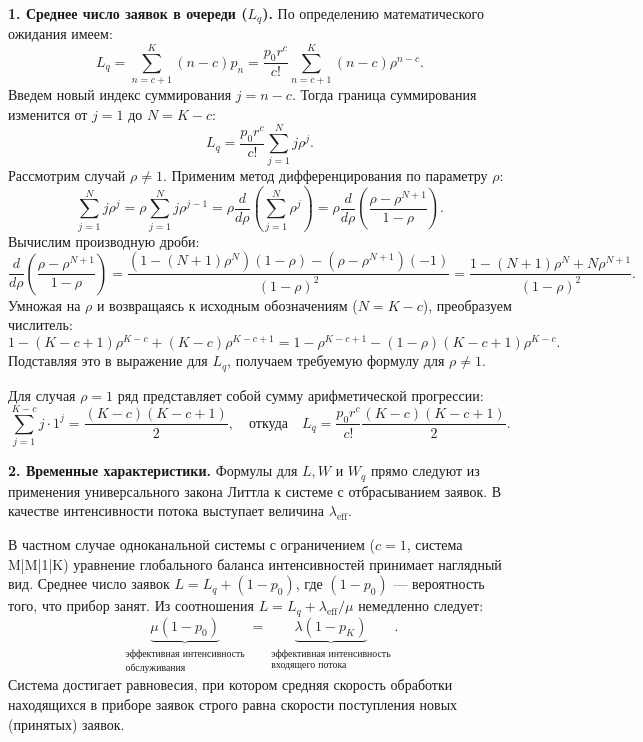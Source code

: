 \begin{sproof}
\textbf{1. Среднее число заявок в очереди ($L_q$).} По определению математического ожидания имеем:
$$
L_q = \sum_{n=c+1}^{K} (n - c) p_n = \frac{p_0 r^c}{c!} \sum_{n=c+1}^{K} (n - c) \rho^{n-c}.
$$
Введем новый индекс суммирования $j = n - c$. Тогда граница суммирования изменится от $j = 1$ до $N = K - c$:
$$
L_q = \frac{p_0 r^c}{c!} \sum_{j=1}^{N} j \rho^j.
$$
Рассмотрим случай $\rho \ne 1$. Применим метод дифференцирования по параметру $\rho$:
$$
\sum_{j=1}^{N} j \rho^j = \rho \sum_{j=1}^{N} j \rho^{j-1} = \rho \frac{d}{d\rho} \left( \sum_{j=1}^{N} \rho^j \right) = \rho \frac{d}{d\rho} \left( \frac{\rho - \rho^{N+1}}{1 - \rho} \right).
$$
Вычислим производную дроби:
$$
\frac{d}{d\rho} \left( \frac{\rho - \rho^{N+1}}{1 - \rho} \right) = \frac{(1 - (N+1)\rho^N)(1 - \rho) - (\rho - \rho^{N+1})(-1)}{(1 - \rho)^2} = \frac{1 - (N+1)\rho^N + N\rho^{N+1}}{(1 - \rho)^2}.
$$
Умножая на $\rho$ и возвращаясь к исходным обозначениям ($N = K - c$), преобразуем числитель:
$$
1 - (K - c + 1)\rho^{K-c} + (K - c)\rho^{K-c+1} = 1 - \rho^{K-c+1} - (1 - \rho)(K - c + 1)\rho^{K-c}.
$$
Подставляя это в выражение для $L_q$, получаем требуемую формулу для $\rho \ne 1$.

Для случая $\rho = 1$ ряд представляет собой сумму арифметической прогрессии:
$$
\sum_{j=1}^{K-c} j \cdot 1^j = \frac{(K - c)(K - c + 1)}{2}, \quad \text{откуда} \quad L_q = \frac{p_0 r^c}{c!} \frac{(K - c)(K - c + 1)}{2}.
$$

\textbf{2. Временные характеристики.} Формулы для $L, W$ и $W_q$ прямо следуют из применения универсального закона Литтла к системе с отбрасыванием заявок. В качестве интенсивности потока выступает величина $\lambda_{\text{eff}}$.
\end{sproof}

\begin{conseq}
В частном случае одноканальной системы с ограничением ($c=1$, система M|M|1|K) уравнение глобального баланса интенсивностей принимает наглядный вид. Среднее число заявок $L = L_q + (1 - p_0)$, где $(1 - p_0)$ — вероятность того, что прибор занят. Из соотношения $L = L_q + \lambda_{\text{eff}}/\mu$ немедленно следует:
$$
\underbrace{\mu (1 - p_0)}_{\substack{\text{эффективная интенсивность} \\ \text{обслуживания}}} = \underbrace{\lambda (1 - p_K)}_{\substack{\text{эффективная интенсивность} \\ \text{входящего потока}}}.
$$
Система достигает равновесия, при котором средняя скорость обработки находящихся в приборе заявок строго равна скорости поступления новых (принятых) заявок.
\end{conseq}

